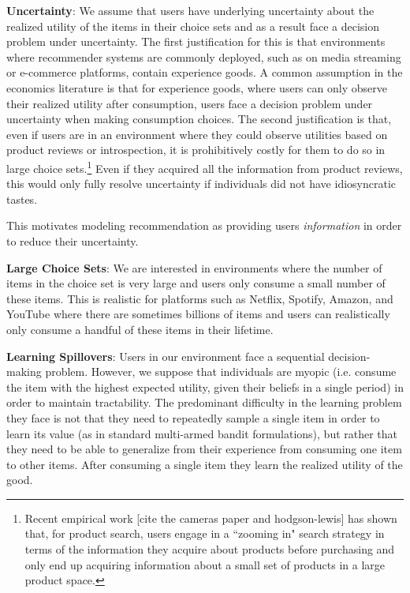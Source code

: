 \documentclass[sigconf]{acmart}
\begin{document}
\noindent \textbf{Uncertainty}: We assume that users have underlying uncertainty about the realized utility of the items in their choice sets and as a result face a decision problem under uncertainty. The first justification for this is that environments where recommender systems are commonly deployed, such as on media streaming or e-commerce platforms, contain experience goods. A common assumption in the economics literature is that for experience goods, where users can only observe their realized utility after consumption, users face a decision problem under uncertainty when making consumption choices. The second justification is that, even if users are in an environment where they could observe utilities based on product reviews or introspection, it is prohibitively costly for them to do so in large choice sets.\footnote{Recent empirical work [cite the cameras paper and hodgson-lewis] has shown that, for product search, users engage in a ``zooming in" search strategy in terms of the information they acquire about products before purchasing and only end up acquiring information about a small set of products in a large product space.} Even if they acquired all the information from product reviews, this would only fully resolve uncertainty if individuals did not have idiosyncratic tastes.

This motivates modeling recommendation as providing users \textit{information} in order to reduce their uncertainty.

\noindent \textbf{Large Choice Sets}: We are interested in environments where the number of items in the choice set is very large and users only consume a small number of these items. This is realistic for platforms such as Netflix, Spotify, Amazon, and YouTube where there are sometimes billions of items and users can realistically only consume a handful of these items in their lifetime.

\noindent \textbf{Learning Spillovers}: Users in our environment face a sequential decision-making problem. However, we suppose that individuals are myopic (i.e. consume the item with the highest expected utility, given their beliefs in a single period) in order to maintain tractability. The predominant difficulty in the learning problem they face is not that they need to repeatedly sample a single item in order to learn its value (as in standard multi-armed bandit formulations), but rather that they need to be able to generalize from their experience from consuming one item to other items. After consuming a single item they learn the realized utility of the good.
\end{document}

